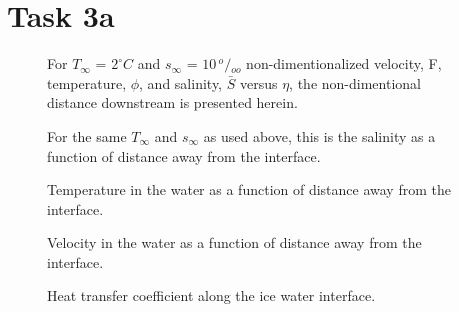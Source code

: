 \section*{Task 3a} %
\label{sec:Task 3a}
	
	\begin{figure}[h]
		\begin{center}
			\newlength\figureheight 
			\newlength\figurewidth 
			\setlength\figureheight{6cm} 
			\setlength\figurewidth{9cm} 
			
		\end{center}
		\caption{For $T_\infty$ = $2^\circ C$ and $s_\infty$ = $10 \, {}^o/{}_{oo}$ non-dimentionalized velocity, F, temperature, $\phi$, and salinity, $\bar{S}$ versus $\eta$, the non-dimentional distance downstream is presented herein.}
		\label{fig:etaVsF_phi_S_3a}
	\end{figure}
	
	\begin{figure}[h]
		\begin{center}
			\setlength\figureheight{6cm} 
			\setlength\figurewidth{9cm} 
			
		\end{center}
		\caption{For the same $T_\infty$ and $s_\infty$ as used above, this is the salinity as a function of distance away from the interface.}
		\label{fig:salinity_3a}
	\end{figure}
	
	\begin{figure}[h]
		\begin{center}
			\setlength\figureheight{6cm} 
			\setlength\figurewidth{9cm} 
			
		\end{center}
		\caption{Temperature in the water as a function of distance away from the interface.}
		\label{fig:temperture_3a}
	\end{figure}
	
	\begin{figure}[h]
		\begin{center}
			\setlength\figureheight{6cm} 
			\setlength\figurewidth{9cm} 
			
		\end{center}
		\caption{Velocity in the water as a function of distance away from the interface.}
		\label{fig:salinity_3a}
	\end{figure}
	
	\begin{figure}[h]
		\begin{center}
			\setlength\figureheight{6cm} 
			\setlength\figurewidth{9cm} 
			
		\end{center}
		\caption{Heat transfer coefficient along the ice water interface.}
		\label{fig:temperture_3a}
	\end{figure}
	
